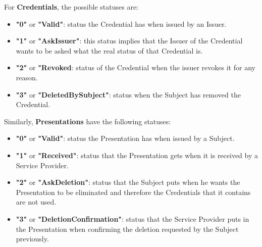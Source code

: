 For \textbf{Credentials}, the possible statuses are:
\begin{itemize}
    \item \textbf{"0"} or \textbf{"Valid"}: status the Credential has when issued by an Issuer.
    \item \textbf{"1"} or \textbf{"AskIssuer"}: this status implies that the Issuer of the Credential wants to be asked what the real status of that Credential is.
    \item \textbf{"2"} or \textbf{"Revoked}: status of the Credential when the issuer revokes it for any reason.
    \item \textbf{"3"} or \textbf{"DeletedBySubject"}: status when the Subject has removed the Credential.
\end{itemize}

Similarly, \textbf{Presentations} have the following statuses:
\begin{itemize}
    \item \textbf{"0"} or \textbf{"Valid"}: status the Presentation has when issued by a Subject.
    \item \textbf{"1"} or \textbf{"Received"}: status that the Presentation gets when it is received by a Service Provider.
    \item \textbf{"2"} or \textbf{"AskDeletion"}: status that the Subject puts when he wants the Presentation to be eliminated and therefore the Credentials that it contains are not used.
    \item \textbf{"3"} or \textbf{"DeletionConfirmation"}: status that the Service Provider puts in the Presentation when confirming the deletion requested by the Subject previously.
\end{itemize}

